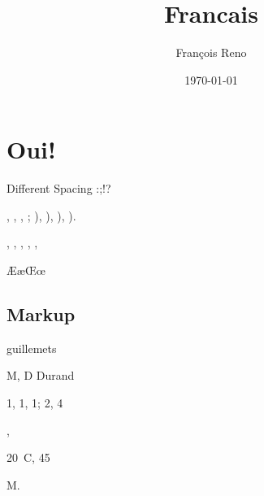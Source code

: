 \documentclass{report}
\begin{document}
\title{Francais}
\author{Fran\c{c}ois Reno}
\date{\today}
\maketitle
\chapter{Oui!}

Different Spacing :;!?

\No \no


\primo, \secundo, \tertio, \quarto; \fprimo), \fsecundo), \ftertio), \fquarto).

\ieme, \iemes, \ier, \iers, \iere, \ieres


\textminus\textplusminus{}

\AE \ae \OE \oe \at \circonflexe \tild \boi \degre

\section{Markup}
\og guillemets \fg{}

M, D Durand

1\ier{}, 1\iere{}, 1\ieres{}; 2\ieme{}, 4\iemes{}

, 

20~\degres C, 45\degres

M. 

\end{document}
